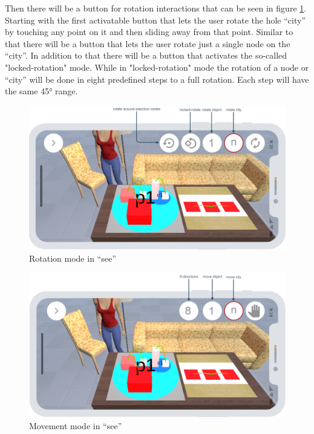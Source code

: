 Then there will be a button for rotation interactions that can be seen in figure \ref{fig:rotate}.
Starting with the first activatable button that lets the user rotate the hole \enquote{\gls{city}} by touching any point on it and then sliding away from that point.
Similar to that there will be a button that lets the user rotate just a single node on the \enquote{\gls{city}}.
In addition to that there will be a button that activates the so-called "locked-rotation" mode.
While in "locked-rotation" mode the rotation of a node or \enquote{\gls{city}} will be done in eight predefined steps to a full rotation.
Each step will have the same 45° range.
\begin{figure}[htb]
    \centering
    \includegraphics[width=1\textwidth]{Concept/img/menu4.png}
    \caption{Rotation mode in \enquote{\gls{see}}}\label{fig:rotate}
\end{figure}

\begin{figure}[htb]
    \centering
    \includegraphics[width=1\textwidth]{Concept/img/menu5.png}
    \caption{Movement mode in \enquote{\gls{see}}}\label{fig:move}
\end{figure}

